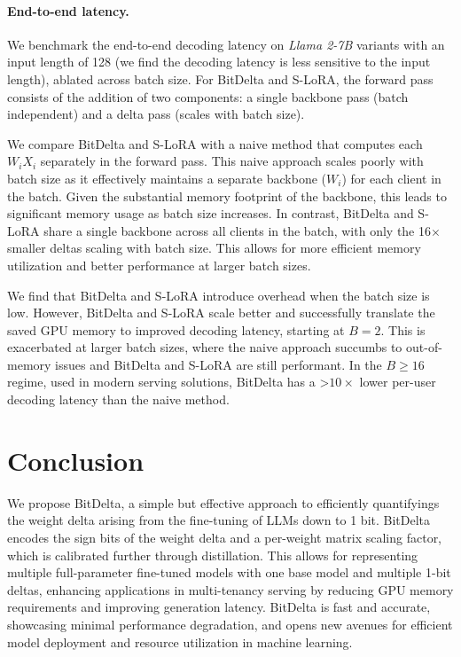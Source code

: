 \documentclass[numbers]{article}
\newcommand{\oursmethod}{BitDelta\xspace}
\begin{document}
\paragraph{End-to-end latency.}
We benchmark the end-to-end decoding latency on \textit{Llama 2-7B} variants with an input length of 128 (we find the decoding latency is less sensitive to the input length), ablated across batch size. For \oursmethod and S-LoRA, the forward pass consists of the addition of two components: a single backbone pass (batch independent) and a delta pass (scales with batch size).

We compare \oursmethod and S-LoRA with a naive method that computes each $W_{i}X_{i}$ separately in the forward pass. This naive approach scales poorly with batch size as it effectively maintains a separate backbone ($W_i$) for each client in the batch. Given the substantial memory footprint of the backbone, this leads to significant memory usage as batch size increases. In contrast, \oursmethod and S-LoRA share a single backbone across all clients in the batch, with only the 16$\times$ smaller deltas scaling with batch size. This allows for more efficient memory utilization and better performance at larger batch sizes.

We find that \oursmethod and S-LoRA introduce overhead when the batch size is low. However, \oursmethod and S-LoRA scale better and successfully translate the saved GPU memory to improved decoding latency, starting at $B=2$. This is exacerbated at larger batch sizes, where the naive approach succumbs to out-of-memory issues and \oursmethod and S-LoRA are still performant. In the $B \geq 16$ regime, used in modern serving solutions, \oursmethod has a >$10\times$ lower per-user decoding latency than the naive method.


\section{Conclusion}
\label{sec:conclusion}
We propose \oursmethod, a simple but effective approach to efficiently quantifyings the weight delta arising from the fine-tuning of LLMs down to 1 bit. \oursmethod encodes the sign bits of the weight delta and a per-weight matrix scaling factor, which is calibrated further through distillation. This allows for representing multiple full-parameter fine-tuned models with one base model and multiple 1-bit deltas, enhancing applications in multi-tenancy serving by reducing GPU memory requirements and improving generation latency. \oursmethod is fast and accurate, showcasing minimal performance degradation, and opens new avenues for efficient model deployment and resource utilization in machine learning.
\end{document}
